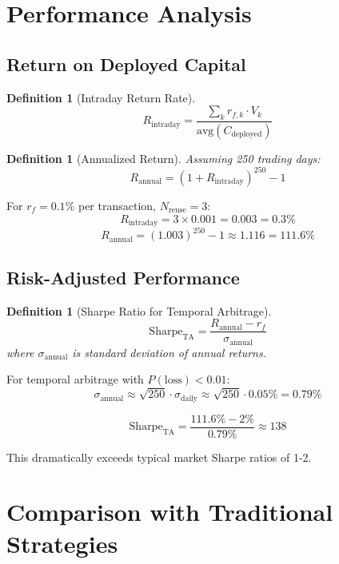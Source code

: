 \documentclass[12pt]{article}
\newtheorem{definition}[theorem]{Definition}
\begin{document}
\section{Performance Analysis}

\subsection{Return on Deployed Capital}

\begin{definition}[Intraday Return Rate]
$$
R_{\text{intraday}} = \frac{\sum_k r_{f,k} \cdot V_k}{\text{avg}(C_{\text{deployed}})}
$$
\end{definition}

\begin{definition}[Annualized Return]
Assuming 250 trading days:
$$
R_{\text{annual}} = (1 + R_{\text{intraday}})^{250} - 1
$$
\end{definition}

\begin{example}
For $r_f = 0.1\%$ per transaction, $N_{\text{reuse}} = 3$:
$$
R_{\text{intraday}} = 3 \times 0.001 = 0.003 = 0.3\%
$$
$$
R_{\text{annual}} = (1.003)^{250} - 1 \approx 1.116 = 111.6\%
$$
\end{example}

\subsection{Risk-Adjusted Performance}

\begin{definition}[Sharpe Ratio for Temporal Arbitrage]
$$
\text{Sharpe}_{\text{TA}} = \frac{R_{\text{annual}} - r_f}{\sigma_{\text{annual}}}
$$
where $\sigma_{\text{annual}}$ is standard deviation of annual returns.
\end{definition}

For temporal arbitrage with $P(\text{loss}) < 0.01$:
$$
\sigma_{\text{annual}} \approx \sqrt{250} \cdot \sigma_{\text{daily}} \approx \sqrt{250} \cdot 0.05\% = 0.79\%
$$

$$
\text{Sharpe}_{\text{TA}} = \frac{111.6\% - 2\%}{0.79\%} \approx 138
$$

This dramatically exceeds typical market Sharpe ratios of 1-2.

\section{Comparison with Traditional Strategies}
\end{document}
